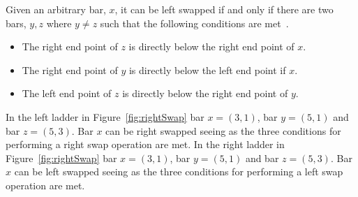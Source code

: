 Given an arbitrary bar, $x$, it can be left swapped if and only if there are two bars, $y,z$ where $y \neq z$ 
such that the following conditions are met~\cite{A1}.
\begin{itemize}
	\item The right end point of $z$ is directly below the right end point of $x$.
	\item The right end point of $y$ is directly below the left end point if $x$.
	\item The left end point of $z$ is directly below the right end point of $y$.
\end{itemize}
In the left ladder in Figure~\ref{fig:rightSwap} bar $x=(3,1)$, bar $y=(5,1)$ and bar $z=(5,3)$. Bar $x$ can be right swapped 
seeing as the three conditions for performing a right swap operation are met.
In the right ladder in Figure~\ref{fig:rightSwap} bar $x=(3,1)$, bar $y=(5,1)$ and bar $z=(5,3)$. Bar $x$ can be left swapped 
seeing as the three conditions for performing a left swap operation are met.
